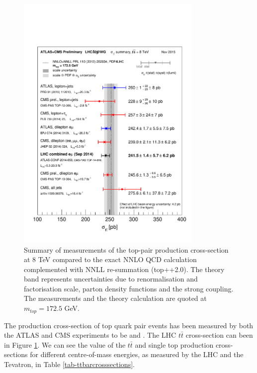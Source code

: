 \begin{figure} \label{fig-ttbarCombinedXsect}
\begin{center}
\includegraphics[width=0.8\textwidth]{Figures/ttbarCombinedXsect.pdf}
\caption{Summary of measurements of the top-pair production cross-section at 8 TeV compared to the exact NNLO QCD calculation complemented with NNLL re-summation (top++2.0). The theory band represents uncertainties due to renormalisation and factorisation scale, parton density functions and the strong coupling. The measurements and the theory calculation are quoted at $m_{top}=172.5$ GeV. \cite{ttbarXsectCombination}}
\end{center}
\end{figure}

The production cross-section of top quark pair events has been measured by both the ATLAS and CMS experiments to be  \cite{} and \cite{}. The LHC $t\bar{t}$ cross-section can been in Figure \ref{fig-ttbarCombinedXsect}. We can see the value of the $t\bar{t}$ and single top production cross-sections for different centre-of-mass energies, as measured by the LHC and the Tevatron, in Table \ref{tab-ttbarcrosssections}. 

